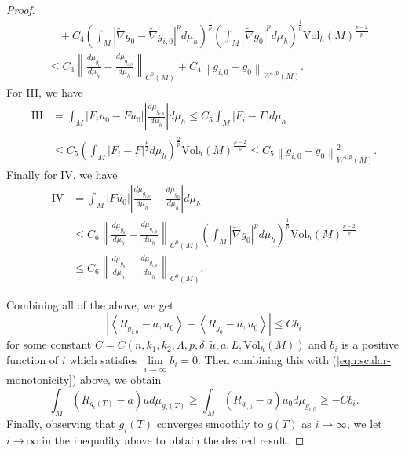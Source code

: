\documentclass[12pt]{amsart}
\theoremstyle{plain}
\theoremstyle{plain}
\theoremstyle{definition}
\theoremstyle{remark}
\numberwithin{equation}{subsection}
\newcommand{\hdel}{\tilde{\nabla}}
\begin{document}
\begin{proof}
\begin{align*}
        &\quad + C_4\left(\int_M |\hdel g_0 - \hdel g_{i,0}|^pd\mu_h\right)^\frac{1}{p}\left(\int_M |\hdel g_0|^pd\mu_h\right)^\frac{1}{p}\text{Vol}_h(M)^\frac{p-2}{p} \nonumber \\
        &\leq C_3\left\lVert \frac{d\mu_{g_0}}{d\mu_h} - \frac{d\mu_{g_{i,0}}}{d\mu_h}\right\rVert_{C^0(M)} + C_4\left\lVert g_{i,0} - g_0\right\rVert_{W^{1,p}(M)}.
    \end{align*}
    For III, we have
    \begin{align*}
        \text{III} &= \int_M |F_iu_0 - Fu_0|\left|\frac{d\mu_{g_{i,0}}}{d\mu_h}\right|d\mu_h \leq C_5 \int_M |F_i - F|d\mu_h \nonumber \\
        &\leq C_5 \left(\int_M |F_i - F|^\frac{p}{2}d\mu_h\right)^\frac{2}{p}\text{Vol}_h(M)^\frac{p-2}{p} \leq C_5\left\lVert g_{i,0} - g_0\right\rVert_{W^{1,p}(M)}^2.
    \end{align*}
    Finally for IV, we have
    \begin{align*}
        \text{IV} &= \int_M |Fu_0|\left|\frac{d\mu_{g_{i,0}}}{d\mu_h} - \frac{d\mu_{g_0}}{d\mu_h}\right|d\mu_h \nonumber \\
        &\leq C_6\left\lVert \frac{d\mu_{g_0}}{d\mu_h} - \frac{d\mu_{g_{i,0}}}{d\mu_h}\right\rVert_{C^0(M)}\left(\int_M |\hdel g_0|^pd\mu_h\right)^\frac{1}{p}\text{Vol}_h(M)^\frac{p-2}{p} \nonumber \\
        &\leq C_6\left\lVert \frac{d\mu_{g_0}}{d\mu_h} - \frac{d\mu_{g_{i,0}}}{d\mu_h}\right\rVert_{C^0(M)}.
    \end{align*}

    Combining all of the above, we get
    \begin{equation*}
        \left|\left\langle R_{g_{i,0}}-a, u_0\right\rangle - \left\langle R_{g_0} - a, u_0\right\rangle \right| \leq Cb_i
    \end{equation*}
    for some constant $C = C(n,k_1,k_2,\Lambda,p,\delta,\tilde{u},a,L,\text{Vol}_h(M))$ and $b_i$ is a positive function of $i$ which satisfies $\lim\limits_{i\to\infty} b_i = 0$. Then combining this with (\ref{eqn:scalar-monotonicity}) above, we obtain
    \begin{equation*}
        \int_M (R_{g_i(T)}-a)\tilde{u}d\mu_{g_i(T)} \geq \int_M (R_{g_{i,0}}-a)u_0d\mu_{g_{i,0}} \geq -Cb_i.
    \end{equation*}
    Finally, observing that $g_i(T)$ converges smoothly to $g(T)$ as $i \to \infty$, we let $i \to \infty$ in the inequality above to obtain the desired result.
\end{proof}
\end{document}
